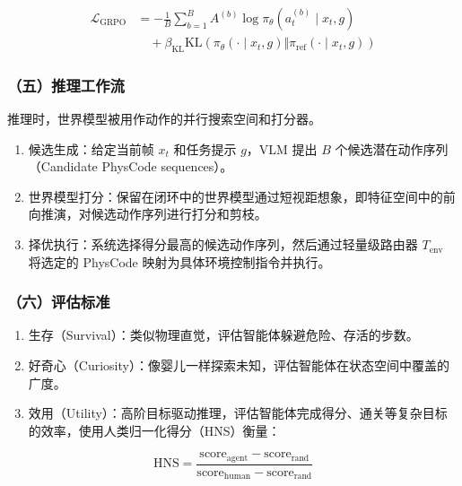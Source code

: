 \[
\begin{aligned}
\mathcal{L}_{\mathrm{GRPO}}
&= -\frac{1}{B}
\sum_{b=1}^{B}
A^{(b)}
\log \pi_\theta(a_t^{(b)} \mid x_t, g)
\\
&\quad+ \beta_{\mathrm{KL}}
\mathrm{KL}\left(
\pi_\theta(\cdot \mid x_t, g)
\Vert
\pi_{\mathrm{ref}}(\cdot \mid x_t, g)
\right)
\end{aligned}
\]

\hypertarget{ux4e94ux63a8ux7406ux5de5ux4f5cux6d41}{%
\subsubsection{（五）推理工作流}\label{ux4e94ux63a8ux7406ux5de5ux4f5cux6d41}}

推理时，世界模型被用作动作的并行搜索空间和打分器。

\begin{enumerate}
\def\labelenumi{\arabic{enumi}.}
\tightlist
\item
  候选生成：给定当前帧 \(x_t\) 和任务提示 \(g\)，VLM 提出 \(B\) 个候选潜在动作序列（Candidate PhysCode sequences）。
\item
  世界模型打分：保留在闭环中的世界模型通过短视距想象，即特征空间中的前向推演，对候选动作序列进行打分和剪枝。
\item
  择优执行：系统选择得分最高的候选动作序列，然后通过轻量级路由器 \(T_{\mathrm{env}}\) 将选定的 PhysCode 映射为具体环境控制指令并执行。
\end{enumerate}

\hypertarget{ux516dux8bc4ux4f30ux6807ux51c6}{%
\subsubsection{（六）评估标准}\label{ux516dux8bc4ux4f30ux6807ux51c6}}

\begin{enumerate}
\def\labelenumi{\arabic{enumi}.}
\tightlist
\item
  生存（Survival）：类似物理直觉，评估智能体躲避危险、存活的步数。
\item
  好奇心（Curiosity）：像婴儿一样探索未知，评估智能体在状态空间中覆盖的广度。
\item
  效用（Utility）：高阶目标驱动推理，评估智能体完成得分、通关等复杂目标的效率，使用人类归一化得分（HNS）衡量：
\end{enumerate}

\[
\mathrm{HNS} =
\frac{\mathrm{score}_{\mathrm{agent}} - \mathrm{score}_{\mathrm{rand}}}
{\mathrm{score}_{\mathrm{human}} - \mathrm{score}_{\mathrm{rand}}}
\]

